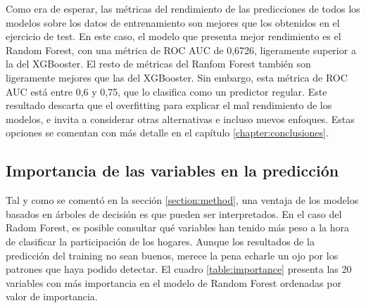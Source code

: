 Como era de esperar, las métricas del rendimiento de las predicciones de todos los modelos sobre los datos de entrenamiento son mejores que los obtenidos en el ejercicio de test. En este caso, el modelo que presenta mejor rendimiento es el Random Forest, con una métrica de ROC AUC de 0,6726, ligeramente superior a la del XGBooster. El resto de métricas del Ranfom Forest también son ligeramente mejores que las del XGBooster. Sin embargo, esta métrica de ROC AUC está entre 0,6 y 0,75, que lo clasifica como un predictor regular. Este resultado descarta que el overfitting para explicar el mal rendimiento de los modelos, e invita a considerar otras alternativas e incluso nuevos enfoques. Estas opciones se comentan con más detalle en el capítulo \ref{chapter:conclusiones}.

\subsection*{Importancia de las variables en la predicción}

Tal y como se comentó en la sección \ref{section:method}, una ventaja de los modelos basados en árboles de decisión es que pueden ser interpretados. En el caso del Radom Forest, es posible consultar qué variables han tenido más peso a la hora de clasificar la participación de los hogares. Aunque los resultados de la predicción del training no sean buenos, merece la pena echarle un ojo por los patrones que haya podido detectar. El cuadro \ref{table:importance} presenta las 20 variables con más importancia en el modelo de Random Forest ordenadas por valor de importancia.

